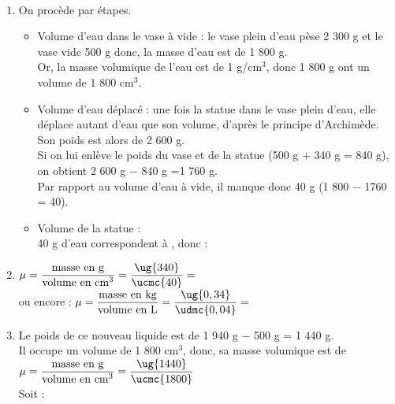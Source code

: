 \ \\ [-5mm]
\begin{enumerate}
   \item On procède par étapes.
   \begin{itemize}
      \item Volume d'eau dans le vase à vide : le vase plein d'eau pèse 2 300 g et le vase vide 500 g donc, la masse d'eau est de 1 800 g. \\
      Or, la masse volumique de l'eau est de 1 g\slash cm$^3$, donc 1 800 g ont un volume de 1 800 cm$^3$.
      \item Volume d'eau déplacé : une fois la statue dans le vase plein d'eau, elle déplace autant d'eau que son volume, d'après le principe d'Archimède. Son poids est alors de 2 600 g. \\
      Si on lui enlève le poids du vase et de la statue (500 g + 340 g = 840 g), on obtient 2 600 g $-$ 840 g =1 760 g. \\
   Par rapport au volume d'eau à vide, il manque donc 40 g (1 800 $-$ 1760 = 40).
   \item Volume de la statue : \\
   40 g d'eau correspondent à , donc : 
   \end{itemize}
   \medskip
   \item $\mu=\dfrac{\text{masse en g}}{\text{volume en cm$^3$}} =\dfrac{\ug{340}}{\ucmc{40}} =\,$ \\ [1mm]
   ou encore : $\mu=\dfrac{\text{masse en kg}}{\text{volume en L}} =\dfrac{\ug{0,34}}{\udmc{0,04}} =\,$ \\
   \medskip
   \item Le poids de ce nouveau liquide est de 1 940 g $-$ 500 g = 1 440 g. \\
   Il occupe un volume de 1 800 cm$^3$, donc, sa masse volumique est de $\mu=\dfrac{\text{masse en g}}{\text{volume en cm$^3$}} =\dfrac{\ug{1440}}{\ucmc{1800}}$ \\
    Soit : 
\end{enumerate}
